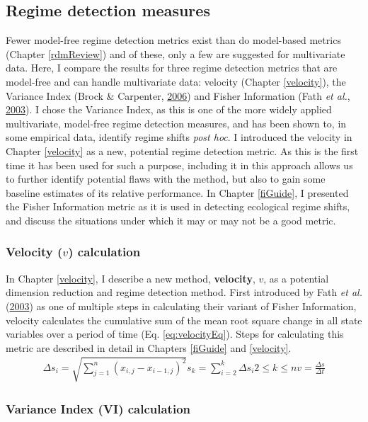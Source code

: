 \documentclass[print]{nuthesis}
\begin{document}
\hypertarget{regime-detection-measures}{%
\subsection{Regime detection measures}\label{regime-detection-measures}}

Fewer model-free regime detection metrics exist than do model-based metrics (Chapter \ref{rdmReview}) and of these, only a few are suggested for multivariate data. Here, I compare the results for three regime detection metrics that are model-free and can handle multivariate data: velocity (Chapter \ref{velocity}), the Variance Index (Brock \& Carpenter, \protect\hyperlink{ref-brock_variance_2006}{2006}) and Fisher Information (Fath \emph{et al.}, \protect\hyperlink{ref-fath_regime_2003}{2003}). I chose the Variance Index, as this is one of the more widely applied multivariate, model-free regime detection measures, and has been shown to, in some empirical data, identify regime shifts \emph{post hoc}. I introduced the velocity in Chapter \ref{velocity} as a new, potential regime detection metric. As this is the first time it has been used for such a purpose, including it in this approach allows us to further identify potential flaws with the method, but also to gain some baseline estimates of its relative performance. In Chapter \ref{fiGuide}, I presented the Fisher Information metric as it is used in detecting ecological regime shifts, and discuss the situations under which it may or may not be a good metric.

\hypertarget{velocity-v-calculation}{%
\subsubsection{\texorpdfstring{Velocity (\(v\)) calculation}{Velocity (v) calculation}}\label{velocity-v-calculation}}

In Chapter \ref{velocity}, I describe a new method, \textbf{velocity}, \(v\), as a potential dimension reduction and regime detection method. First introduced by Fath \emph{et al.} (\protect\hyperlink{ref-fath_regime_2003}{2003}) as one of multiple steps in calculating their variant of Fisher Information, velocity calculates the cumulative sum of the mean root square change in all state variables over a period of time (Eq. \eqref{eq:velocityEq}). Steps for calculating this metric are described in detail in Chapters \ref{fiGuide} and \ref{velocity}.
\begin{equation}
\begin{array}{rcr}
\Delta s_i = \sqrt{\sum_{j=1}^{n} (x_{i,j} -x_{i-1, j})^2}
s_k =  \sum_{i=2}^{k}\Delta{s_i}
2\leq k \leq n
v =\frac{\Delta s}{\Delta t}  
\end{array}
\label{eq:velocityEq}
\end{equation}
\hypertarget{variance-index-vi-calculation}{%
\subsubsection{Variance Index (VI) calculation}\label{variance-index-vi-calculation}}
\end{document}
